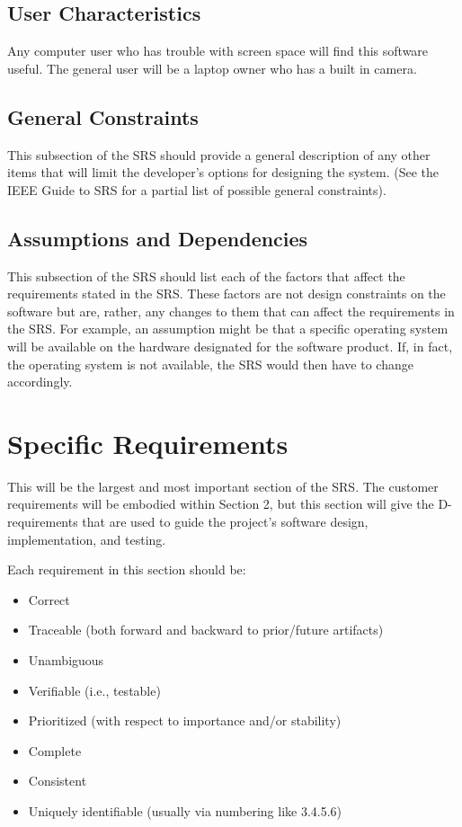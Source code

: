 \documentclass[titlepage]{article}
\begin{document}

\subsection{User Characteristics}
Any computer user who has trouble with screen space will find this software useful. The general user will be a laptop owner who has a built in camera. 

\subsection{General Constraints}
This subsection of the SRS should provide a general description of any other items that will
limit the developer’s options for designing the system. (See the IEEE Guide to SRS for a partial list of possible general constraints).

\subsection{Assumptions and Dependencies}
This subsection of the SRS should list each of the factors that affect the requirements stated in the SRS. These factors are not design constraints on the software but are, rather, any changes to them that can affect the requirements in the SRS. For example, an assumption might be that a specific operating system will be available on the hardware designated for the software product. If, in fact, the operating system is not available, the SRS would then have to change accordingly.

\section{Specific Requirements}
\label{Specific Requirements}
This will be the largest and most important section of the SRS.  The customer requirements will be embodied within Section 2, but this section will give the D-requirements that are used to guide the project’s software design, implementation, and testing.

Each requirement in this section should be:
\begin{itemize}
	\item Correct
	\item Traceable (both forward and backward to prior/future artifacts)
	\item Unambiguous
	\item Verifiable (i.e., testable)
	\item Prioritized (with respect to importance and/or stability)
	\item Complete
	\item Consistent
	\item Uniquely identifiable (usually via numbering like 3.4.5.6)
\end{itemize}
\end{document}
